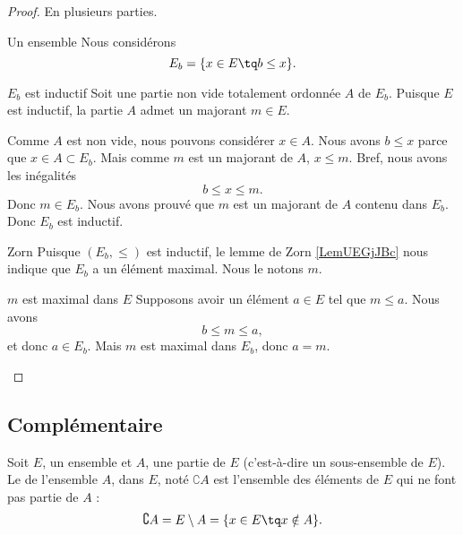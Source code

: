 \begin{proof}
    En plusieurs parties.
    \begin{subproof}
    \item[Un ensemble]
        Nous considérons
        \begin{equation}
            E_b=\{ x\in E\tq b\leq x \}.
        \end{equation}
    \item[\( E_b\) est inductif]
        Soit une partie non vide totalement ordonnée \( A\) de \( E_b\). Puisque \( E\) est inductif, la partie \( A\) admet un majorant \( m\in E\).

        Comme \( A\) est non vide, nous pouvons considérer \( x\in A\). Nous avons $ b\leq x$ parce que \( x\in A\subset E_b\). Mais comme \( m\) est un majorant de \( A\), \( x\leq m\). Bref, nous avons les inégalités
        \begin{equation}
            b\leq x\leq m.
        \end{equation}
        Donc \( m\in E_b\). Nous avons prouvé que \( m\) est un majorant de \( A\) contenu dans \( E_b\). Donc \( E_b\) est inductif.
    \item[Zorn]
        Puisque \( (E_b,\leq)\) est inductif, le lemme de Zorn \ref{LemUEGjJBc} nous indique que \( E_b\) a un élément maximal. Nous le notons \( m\).
    \item[\( m\) est maximal dans \( E\)]
        Supposons avoir un élément \( a\in E\) tel que \( m\leq a\). Nous avons
        \begin{equation}
            b\leq m\leq a,
        \end{equation}
        et donc \( a\in E_b\). Mais \( m\) est maximal dans \( E_b\), donc \( a=m\).
    \end{subproof}
\end{proof}


\subsection{Complémentaire}
\label{AppComplement}

\begin{definition}
    Soit $E$, un ensemble et $A$, une partie de $E$ (c'est-à-dire un sous-ensemble de $E$). Le  de l'ensemble $A$, dans $E$, noté $\complement A$ est l'ensemble des éléments de $E$ qui ne font pas partie de $A$ :
    \begin{equation}
	    \complement A=E\setminus A=\{ x\in E\tq x\notin A \}.
    \end{equation}
\end{definition}

